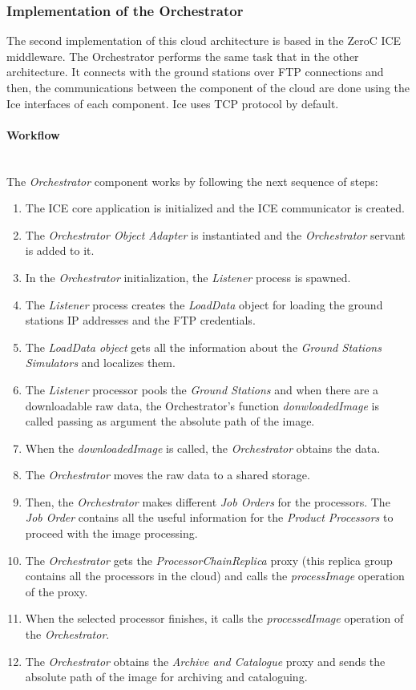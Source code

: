 \subsubsection{Implementation of the Orchestrator}

The second implementation of this cloud architecture is based in the ZeroC ICE
middleware. The Orchestrator performs the same task that in the other
architecture. It connects with the ground stations over \ac{FTP} connections and
then, the communications between the component of the cloud are done using the
Ice interfaces of each component. Ice uses \ac{TCP} protocol by default.

\paragraph{Workflow}~\\

The \emph{Orchestrator} component works by following the next sequence of steps:
\begin{enumerate}
\item The ICE core application is initialized and the ICE communicator is
  created.
\item The \emph{Orchestrator Object Adapter} is instantiated and the \emph{Orchestrator} servant is
  added to it.
\item In the \emph{Orchestrator} initialization, the \emph{Listener} process is spawned.
\item The \emph{Listener} process creates the \emph{LoadData} object for loading the ground
  stations \ac{IP} addresses and the \ac{FTP} credentials.
\item The \emph{LoadData object} gets all the information about the \emph{Ground
    Stations Simulators} and localizes them.
\item The \emph{Listener} processor pools the \emph{Ground Stations} and when there are
  a downloadable raw data, the Orchestrator's function \emph{donwloadedImage} is
  called passing as argument the absolute path of the image. 
\item  When the \emph{downloadedImage} is called, the \emph{Orchestrator}
  obtains the data.
\item  The \emph{Orchestrator} moves the raw data to a shared storage.
\item Then, the \emph{Orchestrator} makes different \emph{Job Orders} for the processors. The \emph{Job Order} contains all the useful information for the \emph{Product Processors} to proceed with the image processing.
\item The \emph{Orchestrator} gets the \emph{ProcessorChainReplica} proxy (this
  replica group contains all the processors in the cloud) and calls the
  \emph{processImage} operation of the proxy.
\item When the selected processor finishes, it calls the \emph{processedImage}
  operation of the \emph{Orchestrator}.
\item The \emph{Orchestrator} obtains the \emph{Archive and Catalogue} proxy and
  sends the absolute path of the image for archiving and cataloguing.
\end{enumerate}

